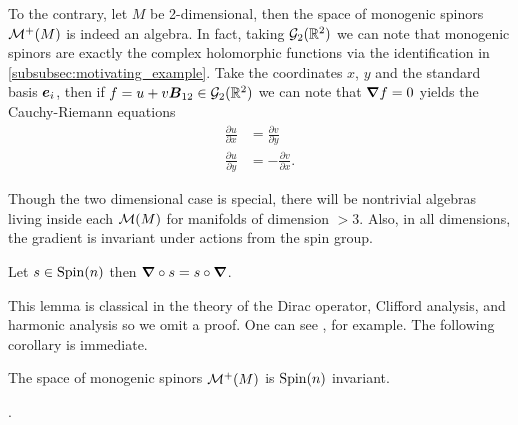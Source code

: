 To the contrary, let $M$ be 2-dimensional, then the space of monogenic spinors $\mathcal{M}^+(M)$ is indeed an algebra. In fact, taking $\mathcal{G}_2(\mathbb{R}^2)$ we can note that monogenic spinors are exactly the complex holomorphic functions via the identification in \cref{subsubsec:motivating_example}. Take the coordinates $x$, $y$ and the standard basis $\boldsymbol{e}_i$, then if $f=u+v\boldsymbol{B}_{12} \in \mathcal{G}_2(\mathbb{R}^2)$ we can note that $\boldsymbol{\nabla} f =0$ yields the Cauchy-Riemann equations
\begin{align}
    \frac{\partial u}{\partial x} &= \frac{\partial v}{\partial y}\\
    \frac{\partial u}{\partial y} &= -\frac{\partial v}{\partial x}.
\end{align}

Though the two dimensional case is special, there will be nontrivial algebras living inside each $\mathcal{M}(M)$ for manifolds of dimension $>3$. Also, in all dimensions, the gradient is invariant under actions from the spin group.
\begin{lemma}
\label{lem:clifford_invariant}
Let $s\in \operatorname{Spin}(n)$ then $\boldsymbol{\nabla} \circ s = s \circ \boldsymbol{\nabla}$.
\end{lemma}
This lemma is classical in the theory of the Dirac operator, Clifford analysis, and harmonic analysis so we omit a proof.  One can see \cite{janssens_special_nodate}, for example. The following corollary is immediate.
\begin{corollary}
The space of monogenic spinors $\mathcal{M}^+(M)$ is $\operatorname{Spin}(n)$ invariant.
\end{corollary}
.


